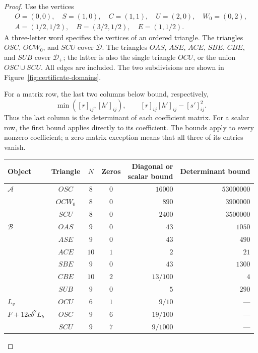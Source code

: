 \begin{proof}
Use the vertices
\[
\begin{gathered}
 O=(0,0),\quad S=(1,0),\quad C=(1,1),\quad
 U=(2,0),\quad W_0=(0,2),\\
 A=(1/2,1/2),\quad B=(3/2,1/2),\quad E=(1,1/2).
\end{gathered}
\]
A three-letter word specifies the vertices of an ordered triangle.
The triangles $OSC$, $OCW_0$, and $SCU$ cover $\mathcal D$.
The triangles $OAS$, $ASE$, $ACE$, $SBE$, $CBE$, and $SUB$ cover
$\mathcal D_+$; the latter is also the single triangle $OCU$, or the
union $OSC\cup SCU$. All edges are included. The two subdivisions are
shown in Figure~\ref{fig:certificate-domains}.



For a matrix row, the last two columns below bound, respectively,
\[
 \min([r]_{ij},[h']_{ij}),\qquad
 [r]_{ij}[h']_{ij}-[s']_{ij}^{2}.
\]
Thus the last column is the determinant of each coefficient matrix.
For a scalar row, the first bound applies directly to its coefficient.
The bounds apply to every nonzero coefficient; a zero matrix exception
means that all three of its entries vanish.
\begin{center}
\small
\begin{tabular}{@{}lcccrr@{}}
\toprule
Object & Triangle & $N$ & Zeros &
 \shortstack{Diagonal or\\scalar bound} & Determinant bound\\
\midrule
$\mathcal A$ & $OSC$ & $8$ & $0$ & $16000$ & $53000000$\\
 & $OCW_0$ & $8$ & $0$ & $890$ & $3900000$\\
 & $SCU$ & $8$ & $0$ & $2400$ & $3500000$\\
\midrule
$\mathcal B$ & $OAS$ & $9$ & $0$ & $43$ & $1050$\\
 & $ASE$ & $9$ & $0$ & $43$ & $490$\\
 & $ACE$ & $10$ & $1$ & $2$ & $21$\\
 & $SBE$ & $9$ & $0$ & $43$ & $1300$\\
 & $CBE$ & $10$ & $2$ & $13/100$ & $4$\\
 & $SUB$ & $9$ & $0$ & $5$ & $290$\\
\midrule
$L_v$ & $OCU$ & $6$ & $1$ & $9/10$ & ---\\
$F+12c\delta^2L_b$ & $OSC$ & $9$ & $6$ & $19/100$ & ---\\
 & $SCU$ & $9$ & $7$ & $9/1000$ & ---\\
\bottomrule
\end{tabular}
\end{center}


\end{proof}
